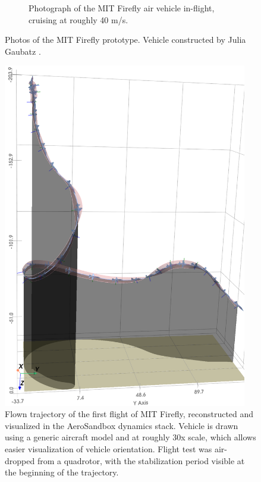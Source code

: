\begin{figure}[H]
\begin{subfigure}[b]{0.432\textwidth}
        \caption{Photograph of the MIT Firefly air vehicle in-flight, cruising at roughly 40 m/s.}
    \end{subfigure}
    \caption{Photos of the MIT Firefly prototype. Vehicle constructed by Julia Gaubatz \cite{gaubatz_design_2024}.}
    \label{fig:firefly_flight_test}
\end{figure}

\begin{figure}[H]
    \centering
    \includegraphics[width=0.95\textwidth,trim={0 0.2in 0 0.8in}]{../figures/firefly_flight_render.png}
    \caption{Flown trajectory of the first flight of MIT Firefly, reconstructed and visualized in the AeroSandbox dynamics stack. Vehicle is drawn using a generic aircraft model and at roughly 30x scale, which allows easier visualization of vehicle orientation. Flight test was air-dropped from a quadrotor, with the stabilization period visible at the beginning of the trajectory.}
    \label{fig:firefly_flight_render}
\end{figure}


